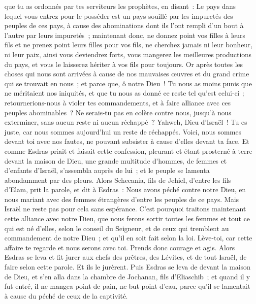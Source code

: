 \begin{multicols}{2}
que tu as ordonnés par tes serviteurs les prophètes, en disant~: Le pays dans lequel vous entrez pour le posséder est un pays souillé par les impuretés des peuples de ces pays, à cause des abominations dont ils l'ont rempli d'un bout à l'autre par leurs impuretés~;
maintenant donc, ne donnez point vos filles à leurs fils et ne prenez point leurs filles pour vos fils, ne cherchez jamais ni leur bonheur, ni leur paix, ainsi vous deviendrez forts, vous mangerez les meilleures productions du pays, et vous le laisserez hériter à vos fils pour toujours.
Or après toutes les choses qui nous sont arrivées à cause de nos mauvaises œuvres et du grand crime qui se trouvait en nous~; et parce que, ô notre Dieu~! Tu nous as moins punis que ne méritaient nos iniquités, et que tu nous as donné ce reste tel qu'est celui-ci~;
retournerions-nous à violer tes commandements, et à faire alliance avec ces peuples abominables~? Ne serais-tu pas en colère contre nous, jusqu'à nous exterminer, sans aucun reste ni aucun réchappé~?
Yahweh, Dieu d'Israël~! Tu es juste, car nous sommes aujourd'hui un reste de réchappés. Voici, nous sommes devant toi avec nos fautes, ne pouvant subsister à cause d'elles devant ta face.
\VerseOne{}Et comme Esdras priait et faisait cette confession, pleurant et étant prosterné à terre devant la maison de Dieu, une grande multitude d'hommes, de femmes et d'enfants d'Israël, s'assembla auprès de lui~; et le peuple se lamenta abondamment par des pleurs.
Alors Schecania, fils de Jehiel, d'entre les fils d'Elam, prit la parole, et dit à Esdras~: Nous avons péché contre notre Dieu, en nous mariant avec des femmes étrangères d'entre les peuples de ce pays. Mais Israël ne reste pas pour cela sans espérance.
C'est pourquoi traitons maintenant cette alliance avec notre Dieu, que nous ferons sortir toutes les femmes et tout ce qui est né d'elles, selon le conseil du Seigneur, et de ceux qui tremblent au commandement de notre Dieu~; et qu'il en soit fait selon la loi.
Lève-toi, car cette affaire te regarde et nous serons avec toi. Prends donc courage et agis.
Alors Esdras se leva et fit jurer aux chefs des prêtres, des Lévites, et de tout Israël, de faire selon cette parole. Et ils le jurèrent.
Puis Esdras se leva de devant la maison de Dieu, et s'en alla dans la chambre de Jochanan, fils d'Eliaschib~; et quand il y fut entré, il ne mangea point de pain, ne but point d'eau, parce qu'il se lamentait à cause du péché de ceux de la captivité.

\end{multicols}

